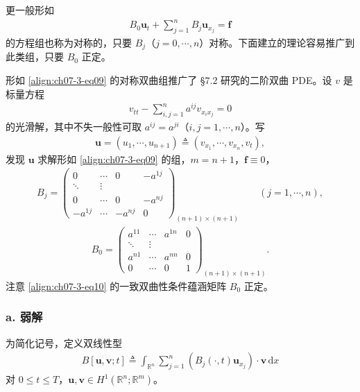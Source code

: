 \documentclass[../../main.tex]{subfiles}
\begin{document}
\begin{remark}
更一般形如
\begin{align}
B_0\mathbf{u}_t+\sum_{j=1}^n B_j\mathbf{u}_{x_j}=\mathbf{f}\label{align:ch07-3-eq09}
\end{align}
的方程组也称为对称的，只要 $B_j$（$j=0,\cdots,n$）对称。下面建立的理论容易推广到此类组，只要 $B_0$ 正定。

形如 \eqref{align:ch07-3-eq09} 的对称双曲组推广了 \S7.2 研究的二阶双曲 PDE。设 $v$ 是标量方程
\begin{align}
v_{tt}-\sum_{i,j=1}^n a^{ij}v_{x_ix_j}=0\label{align:ch07-3-eq10}
\end{align}
的光滑解，其中不失一般性可取 $a^{ij}=a^{ji}$（$i,j=1,\cdots,n$）。写
\begin{align*}
\mathbf{u}=(u_1,\cdots,u_{n+1})\triangleq(v_{x_1},\cdots,v_{x_n},v_t),
\end{align*}
发现 $\mathbf{u}$ 求解形如 \eqref{align:ch07-3-eq09} 的组，$m=n+1$，$\mathbf{f}\equiv 0$，
\begin{align*}
B_j=\begin{pmatrix}
0&\cdots&0&-a^{1j}\\
\ddots&\vdots\\
0&\cdots&0&-a^{nj}\\
-a^{1j}&\cdots&-a^{nj}&0
\end{pmatrix}_{(n+1)\times(n+1)}\qquad (j=1,\cdots,n),
\end{align*}
\begin{align*}
B_0=\begin{pmatrix}
a^{11}&\cdots&a^{1n}&0\\
\ddots&\vdots\\
a^{n1}&\cdots&a^{nn}&0\\
0&\cdots&0&1
\end{pmatrix}_{(n+1)\times(n+1)}.
\end{align*}
注意 \eqref{align:ch07-3-eq10} 的一致双曲性条件蕴涵矩阵 $B_0$ 正定。
\end{remark}

\subsubsection*{a. 弱解}\label{subsubsection:ch07-3-2-a-弱解}

为简化记号，定义双线性型
\begin{align*}
B[\mathbf{u},\mathbf{v};t]\triangleq\int_{\mathbb{R}^n}\sum_{j=1}^n(B_j(\cdot,t)\mathbf{u}_{x_j})\cdot\mathbf{v}\,\mathrm{d}x
\end{align*}
对 $0\leqslant t\leqslant T$，$\mathbf{u},\mathbf{v}\in H^1(\mathbb{R}^n;\mathbb{R}^m)$。
\end{document}
